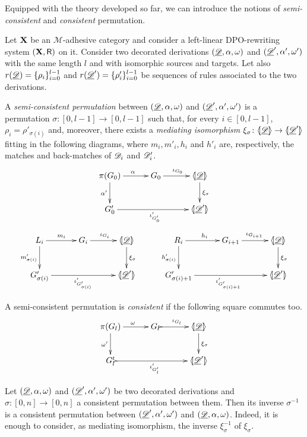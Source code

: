Equipped with the theory developed so far, we can introduce the notions of \emph{semi-consistent} and \emph{consistent} permutation.

\begin{definition}\label{def:permcon}
	Let $\textbf {\textup{X}}$ be an $\mathcal{M}$-adhesive category and consider a left-linear DPO-rewriting system $(\textbf {\textup{X}}, \mathsf{R})$ on it.  Consider two decorated derivations $(\underline{\mathscr{D}}, \alpha, \omega)$ and  $(\underline{\mathscr{D}}', \alpha', \omega')$ with the same length $l$ and with isomorphic sources and targets. Let also $r(\underline{\mathscr{D}})=\{\rho_i\}_{i=0}^{l-1}$ and $r(\underline{\mathscr{D}}')=\{\rho'_i\}_{i=0}^{l-1}$	be sequences of rules associated to the two derivations.
	
	A \emph{semi-consistent permutation} between  $(\underline{\mathscr{D}}, \alpha, \omega)$ and $(\underline{\mathscr{D}}', \alpha', \omega')$ is a permutation $\sigma\colon [0,l-1]\to [0,l-1]$  such that, for every $i\in [0,l-1]$, $\rho_i=\rho'_{\sigma(i)}$ and, moreover, there exists a \emph{mediating isomorphism} $\xi_\sigma\colon \langle \hspace{-1.85pt}[ \underline{\mathscr{D}}]\hspace{-1.85pt}\rangle \to \langle \hspace{-1.85pt}[ \underline{\mathscr{D}}' ]\hspace{-1.85pt}\rangle$ fitting in the following diagrams, where $m_i, m'_i, h_i$ and $h'_i$ are, respectively, the matches and back-matches of $\mathscr{D}_i$ and $\mathscr{D}'_i$.
	\[\xymatrix@C=30pt{\pi(G_0)\ar[r]^{\alpha} \ar[d]_{\alpha'} & G_0 \ar[r]^{\iota_{G_0}} &\tpro{D} \ar[d]^{\xi_\sigma}\\ G'_0 \ar[rr]_{\iota'_{G'_0}} & &\lpro \der{D}' \rpro}\]
	\[\xymatrix@C=30pt{L_i \ar[r]^{m_i} \ar[d]_{m'_{\sigma(i)}}& G_i \ar[r]^{\iota_{G_i}} &\tpro{D} \ar[d]^{\xi_\sigma} & R_i \ar[r]^{h_i} \ar[d]_{h'_{\sigma(i)}}& G_{i+1} \ar[r]^{\iota_{G_{i+1}}} &\tpro{D} \ar[d]^{\xi_\sigma} \\G'_{\sigma(i)} \ar[rr]_{\iota'_{G'_{\sigma(i)}}}&& \lpro \der{D}' \rpro& G'_{\sigma(i)+1} \ar[rr]_{\iota'_{G'_{\sigma(i)+1}}}&& \lpro \der{D}' \rpro}\]
	
	A semi-consistent permutation is \emph{consistent} if the following square commutes too.
	\[\xymatrix@C=30pt{ \pi(G_{l}) \ar[r]^{\omega} \ar[d]_{\omega'} & G_{l} \ar@{>->}[r]^{\iota_{G_{l}}} &\tpro{D} \ar[d]^{\xi_\sigma} \\  G'_{l} \ar@{>->}[rr]_{\iota'_{G'_{l}}} & &\lpro \der{D}' \rpro}\]
\end{definition}

\begin{remark}\label{rem:inversa}
	Let  $(\underline{\mathscr{D}},\alpha, \omega)$ and $(\underline{\mathscr{D}}', \alpha', \omega')$ be two decorated derivations and $\sigma\colon [0,n]\to [0,n]$ a consistent permutation between them.  Then its inverse $\sigma^{-1}$ is a consistent permutation between $(\underline{\mathscr{D}}', \alpha', \omega')$ and $(\underline{\mathscr{D}},\alpha, \omega)$. Indeed, it is enough to consider, as mediating isomorphism, the inverse $\xi^{-1}_\sigma$ of $\xi_\sigma$.
\end{remark}

